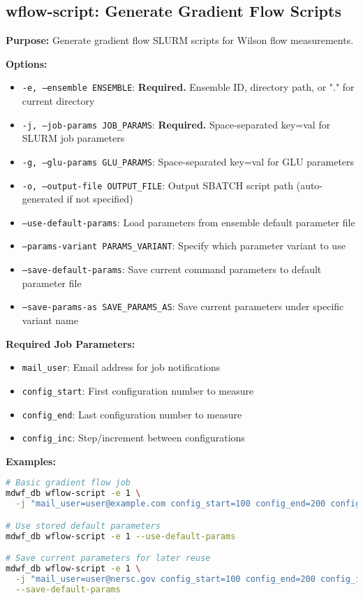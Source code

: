 \documentclass{article}
\begin{document}
\subsection{wflow-script: Generate Gradient Flow Scripts}

\textbf{Purpose:} Generate gradient flow SLURM scripts for Wilson flow measurements.

\textbf{Options:}
\begin{itemize}
\item \texttt{-e, --ensemble ENSEMBLE}: \textbf{Required.} Ensemble ID, directory path, or "." for current directory
\item \texttt{-j, --job-params JOB\_PARAMS}: \textbf{Required.} Space-separated key=val for SLURM job parameters
\item \texttt{-g, --glu-params GLU\_PARAMS}: Space-separated key=val for GLU parameters
\item \texttt{-o, --output-file OUTPUT\_FILE}: Output SBATCH script path (auto-generated if not specified)
\item \texttt{--use-default-params}: Load parameters from ensemble default parameter file
\item \texttt{--params-variant PARAMS\_VARIANT}: Specify which parameter variant to use
\item \texttt{--save-default-params}: Save current command parameters to default parameter file
\item \texttt{--save-params-as SAVE\_PARAMS\_AS}: Save current parameters under specific variant name
\end{itemize}

\textbf{Required Job Parameters:}
\begin{itemize}
\item \texttt{mail\_user}: Email address for job notifications
\item \texttt{config\_start}: First configuration number to measure
\item \texttt{config\_end}: Last configuration number to measure
\item \texttt{config\_inc}: Step/increment between configurations
\end{itemize}

\textbf{Examples:}
\begin{lstlisting}[language=bash]
# Basic gradient flow job
mdwf_db wflow-script -e 1 \
  -j "mail_user=user@example.com config_start=100 config_end=200 config_inc=4"

# Use stored default parameters
mdwf_db wflow-script -e 1 --use-default-params

# Save current parameters for later reuse
mdwf_db wflow-script -e 1 \
  -j "mail_user=user@nersc.gov config_start=100 config_end=200 config_inc=4" \
  --save-default-params
\end{lstlisting}
\end{document}
